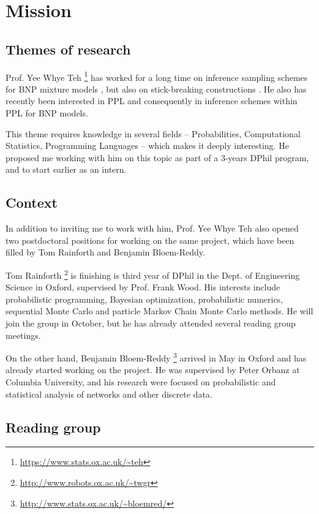 \chapter{Mission}
\section{Themes of research}
Prof. Yee Whye Teh \footnote{\url{https://www.stats.ox.ac.uk/~teh}} has worked for a long time on inference sampling schemes for \gls{BNP} mixture models \cite{Favaro:2013fl, Favaro:2014kg, Lomeli:2015vd, Lomeli:2017kp}, but also on stick-breaking constructions \cite{stick-breaking-ibp, Favaro:2014bo}.
He also has recently been interested in \gls{PPL} and consequently in inference schemes within \gls{PPL} for \gls{BNP} models.

This theme requires knowledge in several fields -- Probabilities, Computational Statistics, Programming Languages -- which makes it deeply interesting.
He proposed me working with him on this topic as part of a 3-years DPhil program, and to start earlier as an intern.

\section{Context}
In addition to inviting me to work with him, Prof. Yee Whye Teh also opened two postdoctoral positions for working on the same project, which have been filled by Tom Rainforth and Benjamin Bloem-Reddy. 

Tom Rainforth \footnote{\url{http://www.robots.ox.ac.uk/~twgr}} is finishing is third year of DPhil in the Dept. of Engineering Science in Oxford, supervised by Prof. Frank Wood. His interests include  probabilistic programming, Bayesian optimization, probabilistic numerics, sequential Monte Carlo and particle Markov Chain Monte Carlo methods. He will join the group in October, but he has already attended several reading group meetings.

On the other hand, Benjamin Bloem-Reddy \footnote{\url{http://www.stats.ox.ac.uk/~bloemred/}} arrived in May in Oxford and has already started working on the project. He was supervised by Peter Orbanz at Columbia University, and his research were focused on probabilistic and statistical analysis of networks and other discrete data.

\section{Reading group}

